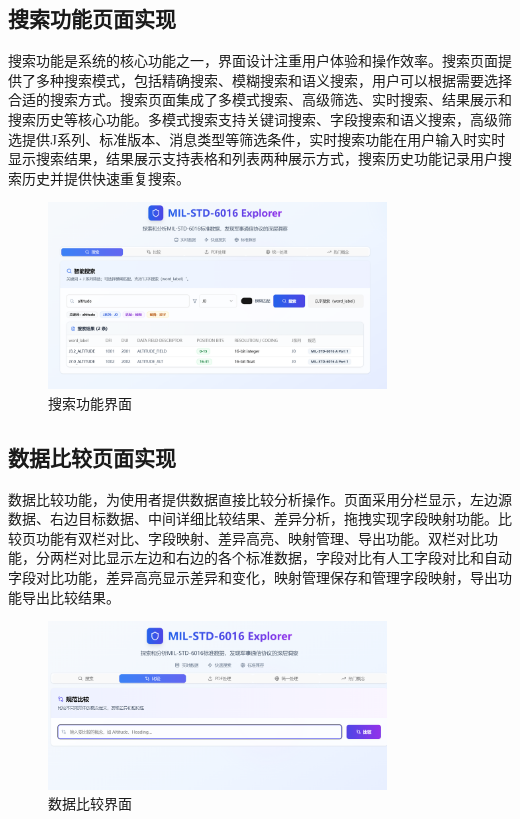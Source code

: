 \subsection{搜索功能页面实现}

搜索功能是系统的核心功能之一，界面设计注重用户体验和操作效率。搜索页面提供了多种搜索模式，包括精确搜索、模糊搜索和语义搜索，用户可以根据需要选择合适的搜索方式。搜索页面集成了多模式搜索、高级筛选、实时搜索、结果展示和搜索历史等核心功能。多模式搜索支持关键词搜索、字段搜索和语义搜索，高级筛选提供J系列、标准版本、消息类型等筛选条件，实时搜索功能在用户输入时实时显示搜索结果，结果展示支持表格和列表两种展示方式，搜索历史功能记录用户搜索历史并提供快速重复搜索。

\begin{figure}[H]
\centering
\includegraphics[width=0.8\textwidth]{chapters/fig-0/front-search.png}
\caption{搜索功能界面}
\label{fig:frontend-search}
\end{figure}

\subsection{数据比较页面实现}

数据比较功能，为使用者提供数据直接比较分析操作。页面采用分栏显示，左边源数据、右边目标数据、中间详细比较结果、差异分析，拖拽实现字段映射功能。比较页功能有双栏对比、字段映射、差异高亮、映射管理、导出功能。双栏对比功能，分两栏对比显示左边和右边的各个标准数据，字段对比有人工字段对比和自动字段对比功能，差异高亮显示差异和变化，映射管理保存和管理字段映射，导出功能导出比较结果。

\begin{figure}[H]
\centering
\includegraphics[width=0.8\textwidth]{chapters/fig-0/front_compare.png}
\caption{数据比较界面}
\label{fig:frontend-compare}
\end{figure}

